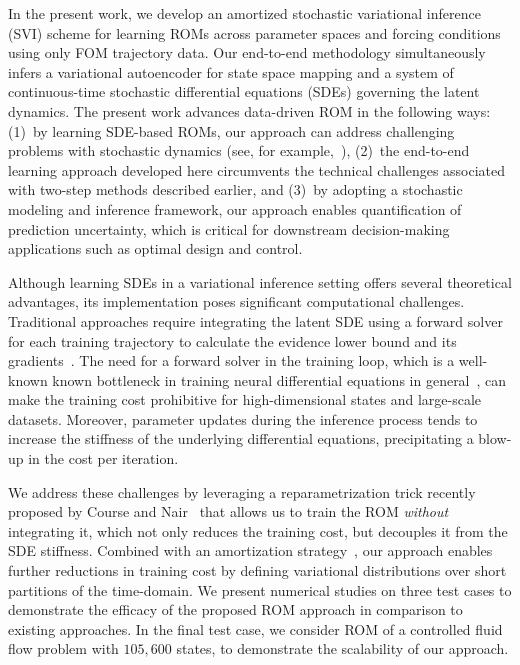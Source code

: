 \documentclass{article}
\begin{document}
	
	In the present work, we develop an amortized stochastic variational inference (SVI) scheme for learning ROMs across parameter spaces and forcing conditions using only FOM trajectory data. Our end-to-end methodology simultaneously infers a variational autoencoder for state space mapping and a system of continuous-time stochastic differential equations (SDEs) governing the latent dynamics. The present work advances data-driven ROM in the following ways: (1)~by learning SDE-based ROMs, our approach can address challenging problems with stochastic dynamics (see, for example,~\cite{Karniadakis_2005_Microflows, Gillespie_2007_Chemical_Kinetics, Rao_2002_Intracellular_Noise}), (2)~the end-to-end learning approach developed here circumvents the technical challenges associated with two-step methods described earlier, and (3)~by adopting a stochastic modeling and inference framework, our approach enables quantification of prediction uncertainty, which is critical for downstream decision-making applications such as optimal design and control.
	
	
	Although learning SDEs in a variational inference setting offers several theoretical advantages, its implementation poses significant computational challenges. Traditional approaches require integrating the latent SDE using a forward solver for each training trajectory to calculate the evidence lower bound and its gradients~\cite{Archambeau_2007_GP_Approx_SDE,Archambeau_2007_Variational_Inference_Diffusion,Li_2020_Scalable_Gradients_VI_SDE}. The need for a forward solver in the training loop, which is a well-known known bottleneck in training neural differential equations in general~\cite{Kidger_2022_Neural_Differential_Equations}, can make the training cost prohibitive for high-dimensional states and large-scale datasets. Moreover, parameter updates during the inference process tends to increase the stiffness of the underlying differential equations, precipitating a blow-up in the cost per iteration. 
	
	We address these challenges by leveraging a reparametrization trick recently proposed by Course and Nair~\cite{Course_2023_State_Estimation} that allows us to train the ROM \emph{without} integrating it, which not only reduces the training cost, but decouples it from the SDE stiffness. Combined with an amortization strategy~\cite{Course_2023_Amortized_Reparameterization}, our approach enables further reductions in training cost by defining variational distributions over short partitions of the time-domain. We present numerical studies on three test cases to demonstrate the efficacy of the proposed ROM approach in comparison to existing approaches. In the final test case, we consider ROM of a controlled fluid flow problem with $105,600$ states, to demonstrate the scalability of our approach.
	
\end{document}
